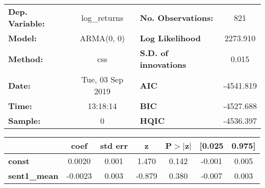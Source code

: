 \begin{center}
\begin{tabular}{lclc}
\toprule
\textbf{Dep. Variable:} &   log\_returns   & \textbf{  No. Observations:  } &    821      \\
\textbf{Model:}         &    ARMA(0, 0)    & \textbf{  Log Likelihood     } &  2273.910   \\
\textbf{Method:}        &       css        & \textbf{  S.D. of innovations} &   0.015     \\
\textbf{Date:}          & Tue, 03 Sep 2019 & \textbf{  AIC                } & -4541.819   \\
\textbf{Time:}          &     13:18:14     & \textbf{  BIC                } & -4527.688   \\
\textbf{Sample:}        &        0         & \textbf{  HQIC               } & -4536.397   \\
\bottomrule
\end{tabular}
\begin{tabular}{lcccccc}
                     & \textbf{coef} & \textbf{std err} & \textbf{z} & \textbf{P$> |$z$|$} & \textbf{[0.025} & \textbf{0.975]}  \\
\midrule
\textbf{const}       &       0.0020  &        0.001     &     1.470  &         0.142        &       -0.001    &        0.005     \\
\textbf{sent1\_mean} &      -0.0023  &        0.003     &    -0.879  &         0.380        &       -0.007    &        0.003     \\
\bottomrule
\end{tabular}
\end{center}
